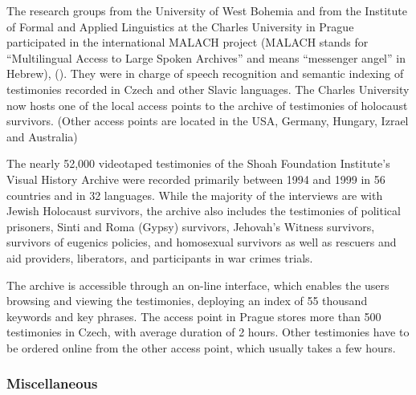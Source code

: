 \begin{multicols}{2}
The research groups from the University of West Bohemia and from the Institute of Formal and Applied Linguistics at the Charles University in Prague participated in the international MALACH project (MALACH stands for “Multilingual Access to Large Spoken Archives” and means “messenger angel” in Hebrew), (\cite{Psutka2005}). They were in charge of speech recognition and semantic indexing of testimonies recorded in Czech and other Slavic languages. The Charles University now hosts one of the local access points to the archive of testimonies of holocaust survivors. (Other access points are located in the USA, Germany, Hungary, Izrael and Australia)

The nearly 52,000 videotaped testimonies of the Shoah Foundation Institute's Visual History Archive were recorded primarily between 1994 and 1999 in 56 countries and in 32 languages. While the majority of the interviews are with Jewish Holocaust survivors, the archive also includes the testimonies of political prisoners, Sinti and Roma (Gypsy) survivors, Jehovah's Witness survivors, survivors of eugenics policies, and homosexual survivors as well as rescuers and aid providers, liberators, and participants in war crimes trials.

The archive is accessible through an on-line interface, which enables the users browsing and viewing the testimonies, deploying an index of 55 thousand keywords and key phrases. The access point in Prague stores more than 500 testimonies in Czech, with average duration of 2 hours. Other testimonies have to be ordered online from the other access point, which usually takes a few hours.

\subsubsection{Miscellaneous}


\end{multicols}
